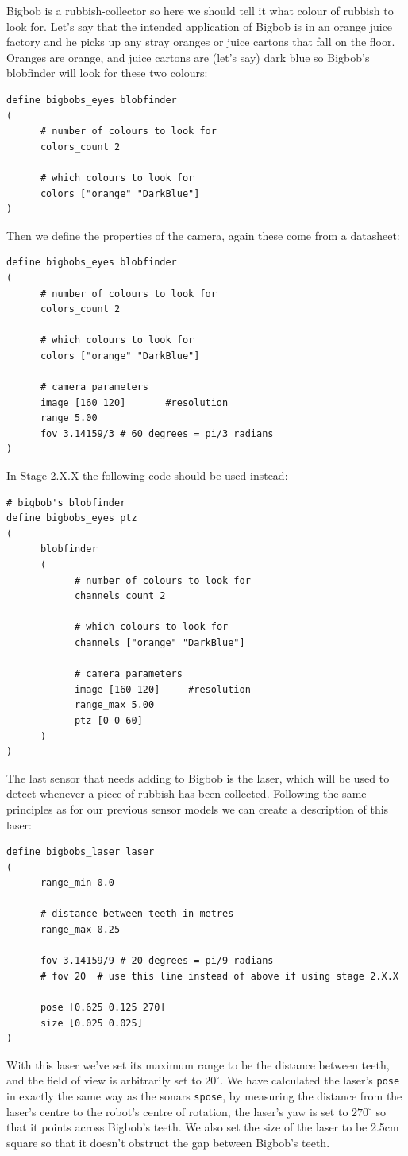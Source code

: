 \documentclass[a4paper]{report}
\begin{document}
Bigbob is a rubbish-collector so here we should tell it what colour of rubbish to look for. Let's say that the intended application of Bigbob is in an orange juice factory and he picks up any stray oranges or juice cartons that fall on the floor. Oranges are orange, and juice cartons are (let's say) dark blue so Bigbob's blobfinder will look for these two colours:
\begin{verbatim}
define bigbobs_eyes blobfinder
(
      # number of colours to look for
      colors_count 2
      
      # which colours to look for
      colors ["orange" "DarkBlue"]
)
\end{verbatim}
Then we define the properties of the camera, again these come from a datasheet:
\begin{verbatim}
define bigbobs_eyes blobfinder
(
      # number of colours to look for
      colors_count 2
      
      # which colours to look for
      colors ["orange" "DarkBlue"]

      # camera parameters
      image [160 120]		#resolution
      range 5.00
      fov 3.14159/3	# 60 degrees = pi/3 radians
)
\end{verbatim}
In Stage 2.X.X the following code should be used instead:
\begin{verbatim}
# bigbob's blobfinder
define bigbobs_eyes ptz
(
      blobfinder
      (
            # number of colours to look for
            channels_count 2

            # which colours to look for
            channels ["orange" "DarkBlue"]
	
            # camera parameters
            image [160 120]		#resolution
            range_max 5.00
            ptz [0 0 60]
      )
)
\end{verbatim}

The last sensor that needs adding to Bigbob is the laser, which will be used to detect whenever a piece of rubbish has been collected. Following the same principles as for our previous sensor models we can create a description of this laser:
\begin{verbatim}
define bigbobs_laser laser
(
      range_min 0.0
	
      # distance between teeth in metres
      range_max 0.25
	
      fov 3.14159/9	# 20 degrees = pi/9 radians
      # fov 20	# use this line instead of above if using stage 2.X.X
      
      pose [0.625 0.125 270]
      size [0.025 0.025]
)
\end{verbatim}
With this laser we've set its maximum range to be the distance between teeth, and the field of view is arbitrarily set to $20^{\circ}$. We have calculated the laser's \verb|pose| in exactly the same way as the sonars \verb|spose|, by measuring the distance from the laser's centre to the robot's centre of rotation, the laser's yaw is set to $270^{\circ}$ so that it points across Bigbob's teeth. We also set the size of the laser to be 2.5cm square so that it doesn't obstruct the gap between Bigbob's teeth.
\end{document}
